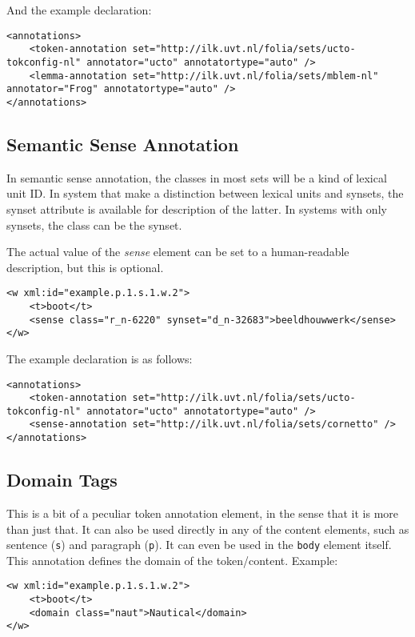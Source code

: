 \documentclass[a4paper,12pt]{article}
\begin{document}
And the example declaration:

\begin{verbatim}
<annotations>
    <token-annotation set="http://ilk.uvt.nl/folia/sets/ucto-tokconfig-nl" annotator="ucto" annotatortype="auto" />
    <lemma-annotation set="http://ilk.uvt.nl/folia/sets/mblem-nl" annotator="Frog" annotatortype="auto" />
</annotations>
\end{verbatim}


\subsection{Semantic Sense Annotation}

In semantic sense annotation, the classes in most sets will be a kind of lexical unit ID. In system that make a distinction between lexical units and synsets, the synset attribute is available for description of the latter. In systems with only synsets, the class can be the synset.

The actual value of the \emph{sense} element can be set to a human-readable description, but this is optional.

\begin{verbatim}
<w xml:id="example.p.1.s.1.w.2">
    <t>boot</t>
    <sense class="r_n-6220" synset="d_n-32683">beeldhouwwerk</sense>
</w>
\end{verbatim}

The example declaration is as follows:

\begin{verbatim}
<annotations>
    <token-annotation set="http://ilk.uvt.nl/folia/sets/ucto-tokconfig-nl" annotator="ucto" annotatortype="auto" />
    <sense-annotation set="http://ilk.uvt.nl/folia/sets/cornetto" />
</annotations>
\end{verbatim}

\subsection{Domain Tags}

This is a bit of a peculiar token annotation element, in the sense that it is more than just that. It can also be used directly in any of the content elements, such as sentence (\texttt{s}) and  paragraph (\texttt{p}). It can even be used in the \texttt{body} element itself. This annotation defines the domain of the token/content. Example:

\begin{verbatim}
<w xml:id="example.p.1.s.1.w.2">
    <t>boot</t>
    <domain class="naut">Nautical</domain>
</w>
\end{verbatim}
\end{document}
